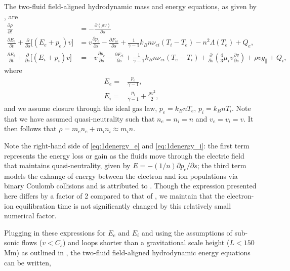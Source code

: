 \documentclass[apj]{emulateapj}
\begin{document}
	\section{}
	\label{appendix}
	\par The two-fluid field-aligned hydrodynamic mass and energy equations, as given by \citet{bradshaw_influence_2013}, are
	\begin{align}
		\frac{\partial\rho}{\partial t} &= -\frac{\partial(\rho v)}{\partial s} \label{eq:1dmass} \\[0.5em]
		\frac{\partial E_e}{\partial t} + \frac{\partial}{\partial s} \lbrack(E_e+p_e)v\rbrack &= v\frac{\partial p_e}{\partial s} - \frac{\partial F_{ce}}{\partial s} + \frac{1}{\gamma - 1}k_Bn\nu_{ei}(T_i-T_e) -n^2\Lambda(T_e)+Q_{e} , \label{eq:1denergy_e} \\[0.5em]
		\frac{\partial E_i}{\partial t} + \frac{\partial }{\partial s}\lbrack(E_i+p_i)v\rbrack &= -v\frac{\partial p_e}{\partial s} - \frac{\partial F_{ci}}{\partial s} + \frac{1}{\gamma - 1}k_Bn\nu_{ei}(T_e-T_i) + \frac{\partial}{\partial s}\left(\frac{4}{3}\mu_iv\frac{\partial v}{\partial s}\right) +\rho v g_{\parallel} + Q_{i},\label{eq:1denergy_i}
	\end{align}
	where
	\begin{align}
		E_e =& \frac{p_e}{\gamma - 1} \label{eq:ee_closure}, \\[0.5em]
		E_i =& \frac{p_i}{\gamma - 1} + \frac{\rho v^2}{2}, \label{eq:ei_closure}
	\end{align}
	and we assume closure through the ideal gas law, $p_e=k_BnT_e,\,p_i=k_BnT_i$. Note that we have assumed quasi-neutrality such that $n_e=n_i=n$ and $v_e=v_i=v$. It then follows that $\rho=m_en_e+m_in_i\approx m_in$.
	\par Note the right-hand side of \autoref{eq:1denergy_e} and \autoref{eq:1denergy_i}: the first term represents the energy loss or gain as the fluids move through the electric field that maintains quasi-neutrality, given by $E=-(1/n)\partial p_e/\partial s$; the third term models the exhange of energy between the electron and ion populations via binary Coulomb collisions and is attributed to \citet{braginskii_transport_1965}. Though the expression presented here differs by a factor of 2 compared to that of \citeauthor{braginskii_transport_1965}, we maintain that the electron-ion equilibration time is not significantly changed by this relatively small numerical factor. 
	\par Plugging in these expressions for $E_e$ and $E_i$ and using the assumptions of sub-sonic flows ($v<C_s$) and loops shorter than a gravitational scale height ($L<150$ Mm) as outlined in \citet{klimchuk_highly_2008}, the two-fluid field-aligned hydrodynamic energy equations can be written,
\end{document}
